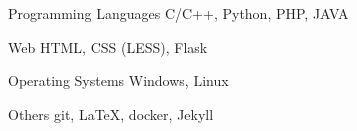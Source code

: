 \cventry{}
    {Programming Languages}
    {}
    {C/C++, Python, PHP, JAVA}
    {}
    {}

\cventry{}
    {Web}
    {}
    {HTML, CSS (LESS), Flask}
    {}
    {}

\cventry{}
    {Operating Systems}
    {}
    {Windows, Linux}
    {}
    {}

\cventry{}
    {Others}
    {}
    {git, \LaTeX, docker, Jekyll}
    {}
    {}
